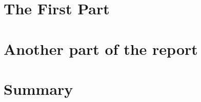 \documentclass[a4paper,11pt,captions=nooneline,parskip=half]{scrreprt}
\begin{document}
	
	

	\part{The First Part}
	\label{part:firstpart}
	

	\part{Another part of the report}\label{part:Some-label}


	\part{Summary}
	

	\printglossary[title={List of Acronyms and Abbreviations}]

	
	
\end{document}
